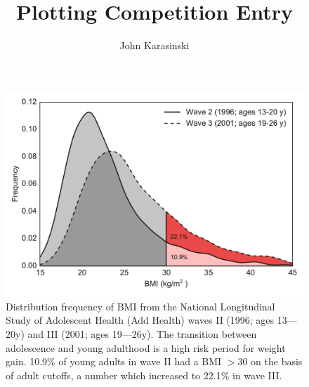 \documentclass[onecolumn,10pt]{jhwhw}
\author{John Karasinski}
\title{Plotting Competition Entry}
\begin{document}
\begin{figure}[h!]
\begin{center}
\includegraphics[width=1\textwidth]{plot.pdf}
\end{center}
\caption{Distribution frequency of BMI from the National Longitudinal Study of Adolescent Health (Add Health) waves II (1996; ages 13---20y) and III (2001; ages 19---26y). The transition between adolescence and young adulthood is a high risk period for weight gain. 10.9\% of young adults in wave II had a BMI $>30$ on the basis of adult cutoffs, a number which increased to 22.1\% in wave III.}
\end{figure}
\end{document}
